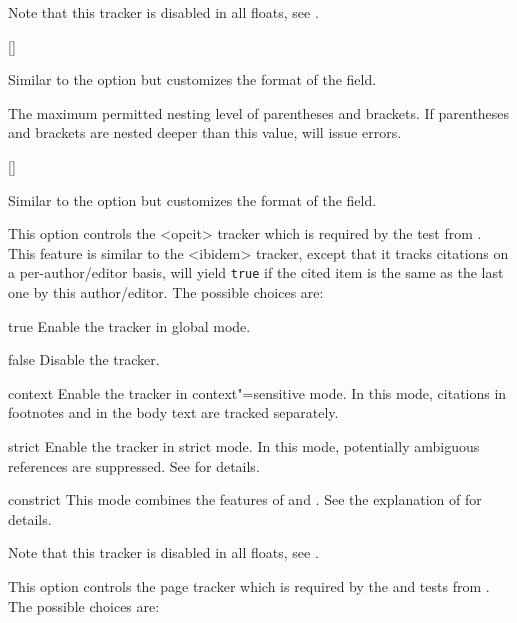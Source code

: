 \documentclass{ltxdockit}[2011/03/25]
\begin{document}
\begin{optionlist}
Note that this tracker is disabled in all floats, see .

[\BiberOnly]

Similar to the  option but customizes the format of the  field.


The maximum permitted nesting level of parentheses and brackets. If parentheses and brackets are nested deeper than this value,  will issue errors.

[\BiberOnly]

Similar to the  option but customizes the format of the  field.


This option controls the <opcit> tracker which is required by the  test from . This feature is similar to the <ibidem> tracker, except that it tracks citations on a per-author/editor basis, \ie {} will yield \texttt{true} if the cited item is the same as the last one by this author\slash editor. The possible choices are:

\begin{valuelist}
\item[true] Enable the tracker in global mode.
\item[false] Disable the tracker.
\item[context] Enable the tracker in context"=sensitive mode. In this mode, citations in footnotes and in the body text are tracked separately.
\item[strict] Enable the tracker in strict mode. In this mode, potentially ambiguous references are suppressed. See  for details.
\item[constrict] This mode combines the features of  and . See the explanation of  for details.
\end{valuelist}

Note that this tracker is disabled in all floats, see .


This option controls the page tracker which is required by the  and  tests from . The possible choices are:


\end{optionlist}
\end{document}
